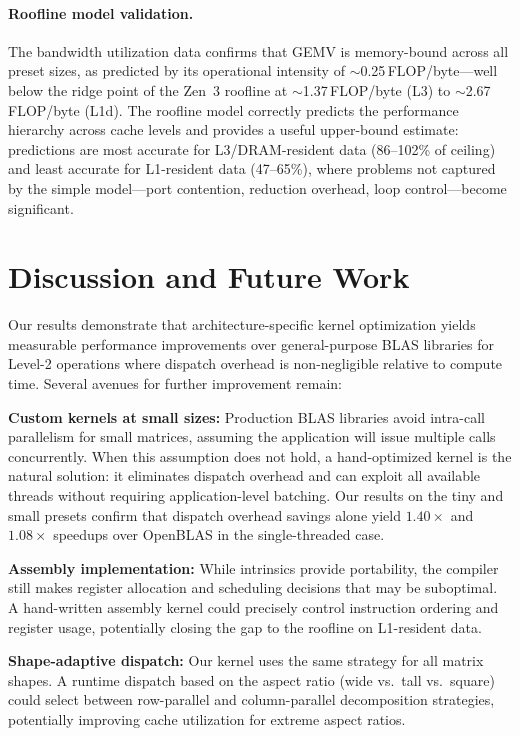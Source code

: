 \documentclass[runningheads]{llncs}
\begin{document}
\paragraph{Roofline model validation.}
The bandwidth utilization data confirms that GEMV is memory-bound across
all preset sizes, as predicted by its operational intensity of
$\sim$0.25\,FLOP/byte---well below the ridge point of the Zen~3
roofline at $\sim$1.37\,FLOP/byte (L3) to $\sim$2.67\,FLOP/byte
(L1d). The roofline model correctly predicts the performance hierarchy
across cache levels and provides a useful upper-bound estimate:
predictions are most accurate for L3/DRAM-resident data
(86--102\% of ceiling) and least accurate for L1-resident data
(47--65\%), where problems not captured by the
simple model---port contention, reduction overhead, loop control---become significant.


\section{Discussion and Future Work}

Our results demonstrate that architecture-specific kernel optimization yields
measurable performance improvements over general-purpose BLAS libraries for Level-2
operations where dispatch overhead is non-negligible relative to compute time.
Several avenues for further improvement remain:

\textbf{Custom kernels at small sizes:} Production BLAS libraries avoid
intra-call parallelism for small matrices, assuming the application will issue
multiple calls concurrently. When this assumption does not hold, a hand-optimized
kernel is the natural solution: it eliminates dispatch overhead and can exploit
all available threads without requiring application-level batching. Our results
on the tiny and small presets confirm that dispatch overhead savings alone yield
$1.40\times$ and $1.08\times$ speedups over OpenBLAS in the single-threaded
case.

\textbf{Assembly implementation:} While intrinsics provide portability, the
compiler still makes register allocation and scheduling decisions that may be
suboptimal. A hand-written assembly kernel could precisely control instruction
ordering and register usage, potentially closing the gap to the roofline on
L1-resident data.

\textbf{Shape-adaptive dispatch:} Our kernel uses the same strategy for all
matrix shapes. A runtime dispatch based on the aspect ratio (wide vs.\ tall vs.\
square) could select between row-parallel and column-parallel decomposition
strategies, potentially improving cache utilization for extreme aspect ratios.
\end{document}

